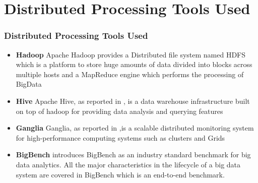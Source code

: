 \documentclass[12pt,xcolor=dvipsnames]{beamer}
\begin{document}
\section{Distributed Processing Tools Used}
\begin{frame}[t]
\frametitle{Distributed Processing Tools Used}
\begin{itemize}
 \item \textbf{Hadoop}
 \newline\noindent
Apache Hadoop \cite{hadoop} provides a Distributed file system named HDFS which is a platform to store huge
amounts of data divided into blocks across multiple hosts and a MapReduce engine which performs
the processing of BigData
\newline
\newline
 \item \textbf{Hive}
 \newline\noindent
Apache Hive, as reported in \cite{hive} , is a data warehouse infrastructure built on top of
hadoop for providing data analysis and querying features

\end{itemize}

\end{frame}

\begin{frame}[t]
\begin{itemize}
\item \textbf{Ganglia}
 \newline\noindent
Ganglia, as reported in \cite{ganglia} ,is a scalable distributed monitoring system for high-performance computing
systems such as clusters and Grids
\newline
\newline
 \item \textbf{BigBench}
 \newline\noindent
\cite{ghazal} introduces BigBench as an industry standard benchmark for big data analytics. All the major characteristics in the
lifecycle of a big data system are covered in BigBench which is an end-to-end benchmark.
\end{itemize}
 
\end{frame}
\end{document}
